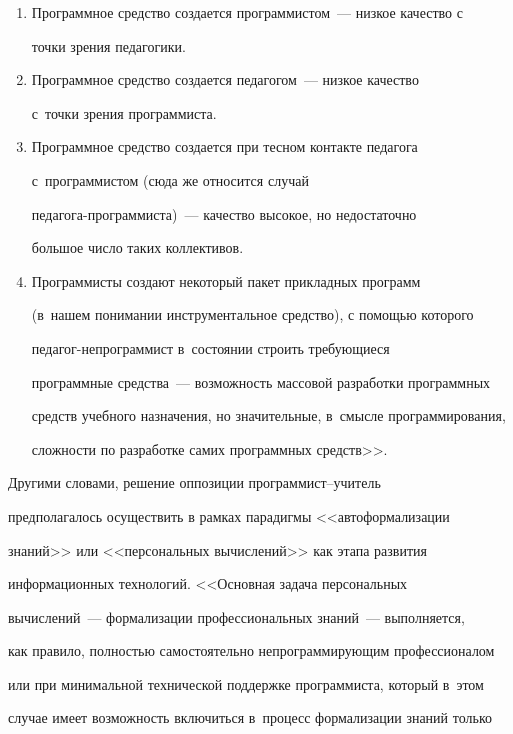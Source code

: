   \begin{enumerate}[1.]

  \item Программное средство создается программистом~--- низкое качество с

точки зрения педагогики.

  \item Программное средство создается педагогом~--- низкое качество

с~точки зрения программиста.

  \item Программное средство создается при тесном контакте педагога

с~программистом (сюда же относится случай

  пе\-да\-го\-га-про\-грам\-миста)~--- качество высокое, но недостаточно

большое число таких коллективов.

  \item  Программисты создают некоторый пакет прикладных программ

(в~нашем понимании инструментальное средство), с помощью которого

  пе\-да\-гог-не\-про\-грам\-мист в~состоянии строить требующиеся

программные средства~--- возможность массовой разработки программных

средств учебного назначения, но значительные, в~смысле программирования,

сложности по разработке самих программных средств>>.

  \end{enumerate}



  Другими словами, решение оппозиции про\-грам\-мист--учи\-тель

предполагалось осуществить в рамках парадигмы <<автоформализации

знаний>> или <<персональных вычислений>> как этапа развития

информационных технологий. <<Основная задача персональных

  вычислений~--- формализации профессиональных знаний~--- выполняется,

как правило, полностью самостоятельно непрограммирующим профессионалом

или при минимальной технической поддержке программиста, который в~этом

случае имеет возможность включиться в~процесс формализации знаний только

